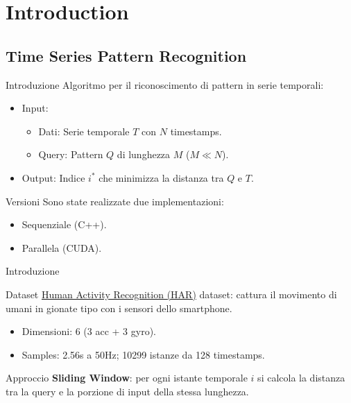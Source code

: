 \section{Introduction}
\subsection{Time Series Pattern Recognition}

\begin{frame}{Introduzione}
    Algoritmo per il riconoscimento di pattern in serie temporali:
    \begin{itemize}
        \item Input:
        \begin{itemize}
            \item Dati: Serie temporale $T$ con $N$ timestamps.
            \item Query: Pattern $Q$ di lunghezza $M$ ($M \ll N$).
        \end{itemize}
        \item Output: Indice $i^*$ che minimizza la distanza tra $Q$ e $T$.
    \end{itemize}
    \begin{block}{Versioni}
        Sono state realizzate due implementazioni:
        \begin{itemize}
            \item Sequenziale (C++).
            \item Parallela (CUDA).
        \end{itemize}
    \end{block}
\end{frame}

\begin{frame}{Introduzione}
    \begin{block}{Dataset}
        \href{https://archive.ics.uci.edu/dataset/240/human+activity+recognition+using+smartphones}{Human Activity Recognition (HAR)} dataset: cattura il movimento di umani in gionate tipo con i sensori dello smartphone.
        \begin{itemize}
            \item Dimensioni: 6 (3 acc + 3 gyro).
            \item Samples: 2.56s a 50Hz; 10299 istanze da 128 timestamps.
        \end{itemize}
    \end{block}
    \begin{block}{Approccio}
        \textbf{Sliding Window}: per ogni istante temporale $i$ si calcola la distanza tra la query e la porzione di input della stessa lunghezza.
    \end{block}
\end{frame}

